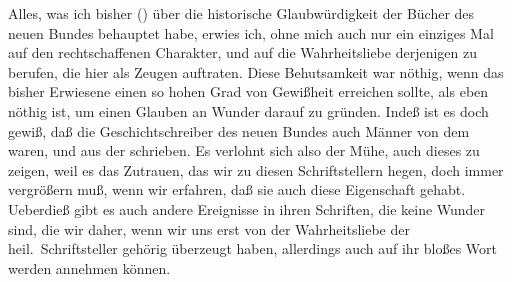 Alles, was ich bisher () über die historische Glaubwürdigkeit der Bücher des neuen Bundes behauptet habe, erwies ich, ohne mich auch nur ein einziges Mal auf den rechtschaffenen Charakter, und auf die Wahrheitsliebe derjenigen zu berufen, die hier als Zeugen auftraten. Diese Behutsamkeit war nöthig, wenn das bisher Erwiesene einen so hohen Grad von Gewißheit erreichen sollte, als eben nöthig ist, um einen Glauben an Wunder darauf zu gründen. Indeß ist es doch gewiß, daß die Geschichtschreiber des neuen Bundes auch Männer von dem  waren, und aus der  schrieben. Es verlohnt sich also der Mühe, auch dieses zu zeigen, weil es das Zutrauen, das wir zu diesen Schriftstellern hegen, doch immer vergrößern muß, wenn wir erfahren, daß sie auch diese Eigenschaft gehabt. Ueberdieß gibt es auch andere Ereignisse in ihren Schriften, die keine Wunder sind, die wir daher, wenn wir uns erst von der Wahrheitsliebe der heil.\ Schriftsteller gehörig überzeugt haben, allerdings auch auf ihr bloßes Wort werden annehmen können.
